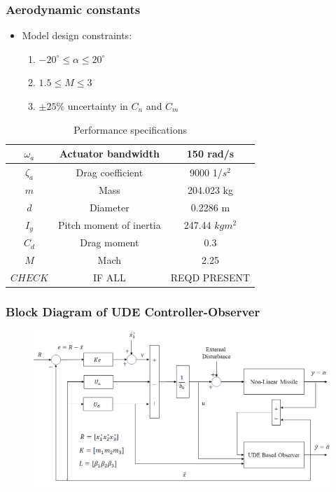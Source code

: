 \documentclass[table,10pt,red]{beamer}	%
\begin{document}
 	\begin{frame}
 	\frametitle{Aerodynamic constants}
 	\begin{itemize}
 		\item Model design constraints:
 		\begin{enumerate}
 			\item $-20^\circ\le \alpha \le20^\circ$
 			\item $1.5 \le M \le 3$
 			\item $\pm25\%$ uncertainty in $C_n$ and $C_m$
 		\end{enumerate}
 	\end{itemize}
 	\begin{table}[h]
 		\begin{center}
 			\caption{Performance specifications}\label{tb1}
 			\begin{tabular}{ccc}
 				\hline
 				$\omega_a$ & Actuator bandwidth & 150 rad/s\\ \hline
 				$\zeta_a$ & Drag coefficient & 9000 1/$s^2$\\ \hline
 				$m$ & Mass & 204.023 kg\\ \hline
 				$d$ & Diameter & 0.2286 m \\ \hline
 				$I_y$ & Pitch moment of inertia & 247.44 $kgm^2$\\ \hline
 				$C_d$ & Drag moment & 0.3\\ \hline
 				$M$ & Mach & 2.25 \\ \hline
 				$CHECK$ & IF ALL & REQD PRESENT \\ \hline
 		
 			\end{tabular}
 		\end{center}
 	\end{table}
 \end{frame}
 	
	\begin{frame}
	\frametitle{Block Diagram of UDE Controller-Observer}
		\begin{figure}
			\includegraphics[width=0.8\linewidth]{block_diag}
		\end{figure}

\end{frame}
\end{document}

